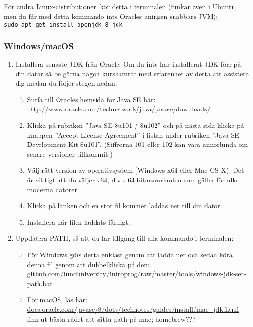 För andra Linux-distributioner, kör detta i terminalen (funkar även i Ubuntu, men du får med detta kommando inte Oracles aningen snabbare JVM): \\ \texttt{sudo apt-get install openjdk-8-jdk}

\subsubsection{Windows/macOS}

\begin{enumerate}
\item Installera senaste JDK från Oracle. Om du inte har installerat JDK förr på din dator så be gärna någon kurskamrat med erfarenhet av detta att assistera dig medan du följer stegen nedan. 

\begin{enumerate}
\item Surfa till Oracles hemsida för Java SE här: \\ \url{http://www.oracle.com/technetwork/java/javase/downloads/}

\item Klicka på rubriken ''Java SE 8u101 / 8u102'' och på nästa sida klicka på knappen ''Accept License Agreement'' i listan under rubriken ''Java SE Development Kit 8u101''. (Siffrorna 101 eller 102 kan vara annorlunda om senare versioner tillkommit.)

\item Välj rätt version av operativsystem (Windows x64 eller Mac OS X). Det är viktigt att du väljer x64, d.v.s 64-bitarsvarianten som gäller för alla moderna datorer.

\item Klicka på länken och en stor fil kommer laddas ner till din dator.

\item Installera när filen laddats färdigt. 

\end{enumerate}

\item Uppdatera PATH, så att du får tillgång till alla kommando i terminalen:
\begin{itemize}
\item För Windows görs detta enklast genom att ladda ner och sedan köra denna fil genom att dubbelklicka på den: \\ \mbox{\href{https://github.com/lunduniversity/introprog/raw/master/tools/windows-jdk-set-path.bat}{github.com/lunduniversity/introprog/raw/master/tools/windows-jdk-set-path.bat}}
\item För macOS, läs här: \\ \href{https://docs.oracle.com/javase/8/docs/technotes/guides/install/mac_jdk.html}{docs.oracle.com/javase/8/docs/technotes/guides/install/mac\_jdk.html} 
\\ \TODO finn ut bästa rådet att sätta path på mac; homebrew??? 


\end{itemize}
\end{enumerate}
